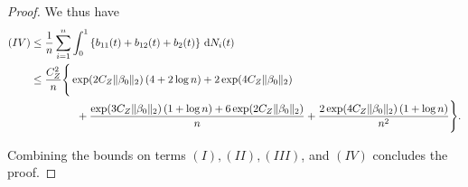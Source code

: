 \documentclass[11pt]{article}
\newcommand{\dint}{\,\mathrm{d}}
\begin{document}
\begin{proof}
We thus have 
\begin{align*}
    (IV) &\leq \frac{1}{n} \sum_{i=1}^n \int_0^1 \left\{b_{11}(t) + b_{12}(t) + b_2(t) \right\} \dint N_i(t) \\
&\leq\frac{C_Z^2}{n}
\Bigg\{\exp\!\left(2C_Z\|\beta_0\|_2\right)(4+2\log n)
+2\exp\!\left(4C_Z\|\beta_0\|_2\right)\\
&\hspace{1.5cm}+\frac{\exp\!\left(3C_Z\|\beta_0\|_2\right)(1+\log n)
+6\exp\!\left(2C_Z\|\beta_0\|_2\right)}{n}
+\frac{2\exp\!\left(4C_Z\|\beta_0\|_2\right)(1+\log n)}{n^2}
\Bigg\}.
\end{align*}

Combining the bounds on terms $(I), (II), (III)$, and $(IV)$ concludes the proof. 
\end{proof}
\end{document}
